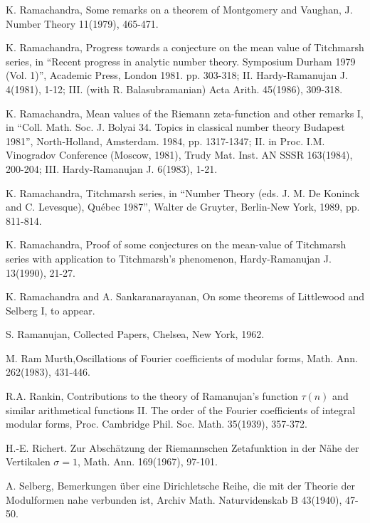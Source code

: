 \begin{thebibliography}{99}
 K. Ramachandra, Some remarks on a theorem of Montgomery and Vaughan, J. Number Theory 11(1979), 465-471.

 K. Ramachandra, Progress towards a conjecture on the mean value of Titchmarsh series, in ``Recent progress in analytic number theory. Symposium Durham 1979 (Vol. 1)'', Academic Press, London 1981. pp. 303-318; II. Hardy-Ramanujan J. 4(1981), 1-12; III. (with R. Balasubramanian) Acta Arith. 45(1986), 309-318. 

 K. Ramachandra, Mean values of the Riemann zeta-function and other remarks I, in ``Coll. Math. Soc. J. Bolyai 34. Topics in classical number theory Budapest 1981'', North-Holland, Amsterdam. 1984, pp. 1317-1347; II. in Proc. I.M. Vinogradov Conference (Moscow, 1981), Trudy Mat. Inst. AN SSSR 163(1984), 200-204; III. Hardy-Ramanujan J. 6(1983), 1-21.

 K. Ramachandra, Titchmarsh series, in ``Number Theory (eds. J. M. De Koninck and C. Levesque), Qu\'ebec 1987'', Walter de Gruyter, Berlin-New York, 1989, pp. 811-814.

 K. Ramachandra, Proof of some conjectures on the mean-value of Titchmarsh series with application to Titchmarsh's phenomenon, Hardy-Ramanujan J. 13(1990), 21-27.

 K. Ramachandra and A. Sankaranarayanan, On some theorems of Littlewood and Selberg I, to appear.

 S. Ramanujan, Collected Papers, Chelsea, New York, 1962.

 M. Ram Murth,\pageoriginale Oscillations of Fourier coefficients of modular forms, Math. Ann. 262(1983), 431-446.

 R.A. Rankin, Contributions to the theory of Ramanujan's function $\tau(n)$ and similar arithmetical functions II. The order of the Fourier coefficients of integral modular forms, Proc. Cambridge Phil. Soc. Math. 35(1939), 357-372.

 H.-E. Richert. Zur Absch\"atzung der Riemannschen Zetafunktion in der N\"ahe der Vertikalen $\sigma =1$, Math. Ann. 169(1967), 97-101.

 A. Selberg, Bemerkungen \"uber eine Dirichletsche Reihe, die mit der Theorie der Modulformen nahe verbunden ist, Archiv Math. Naturvidenskab B 43(1940), 47-50.


\end{thebibliography}
